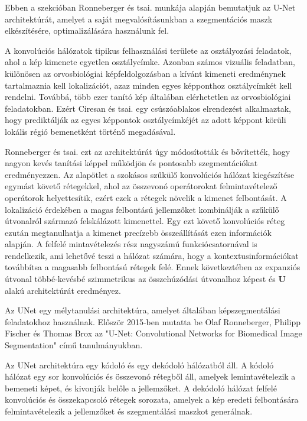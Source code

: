\documentclass[12pt,a4]{article}
\begin{document}
                Ebben a szekcióban \cite{unet}Ronneberger és tsai. munkája alapján bemutatjuk az U-Net architektúrát, amelyet a saját megvalósításunkban a szegmentációs maszk elkészítésére, optimalizálására használunk fel. 
    
                A konvolúciós hálózatok tipikus felhasználási területe az osztályozási feladatok, ahol a kép kimenete egyetlen osztálycímke. Azonban számos vizuális feladatban, különösen az orvosbiológiai képfeldolgozásban a kívánt kimeneti eredménynek tartalmaznia kell lokalizációt, azaz minden egyes képponthoz osztálycímkét kell rendelni. Továbbá, több ezer tanító kép általában elérhetetlen az orvosbiológiai feladatokban. Ezért \cite{ciresan}Ciresan és tsai. egy csúszóablakos elrendezést alkalmaztak, hogy prediktálják
                az egyes képpontok osztálycímkéjét az adott képpont körüli lokális régió bemenetként történő megadásával.
    
                \cite{unet}Ronneberger és tsai. ezt az architektúrát úgy módosították és bővítették, hogy
                nagyon kevés tanítási képpel működjön és pontosabb szegmentációkat eredményezzen.
                Az alapötlet a szokásos szűkülő konvolúciós hálózat kiegészítése egymást követő rétegekkel, ahol az összevonó operátorokat felmintavételező operátorok helyettesítik, ezért ezek a rétegek növelik a kimenet felbontását. A lokalizáció érdekében a magas felbontású jellemzőket kombinálják a szűkülő útvonalról származó felskálázott kimenettel. Egy ezt követő konvolúciós réteg ezután megtanulhatja a kimenet precízebb összeállítását ezen információk alapján. A felfelé mintavételezés rész nagyszámú funkciócsatornával is rendelkezik, ami lehetővé teszi a hálózat számára, hogy a kontextusinformációkat továbbítsa a magasabb felbontású rétegek felé. Ennek következtében az expanziós útvonal többé-kevésbé szimmetrikus az összehúzódási útvonalhoz képest és \textbf{U} alakú architektúrát eredményez.
    
                Az UNet egy mélytanulási architektúra, amelyet általában képszegmentálási feladatokhoz használnak. Először 2015-ben mutatta be \cite{unet}Olaf Ronneberger, Philipp Fischer és Thomas Brox az "U-Net: Convolutional Networks for Biomedical Image Segmentation" című tanulmányukban.
    
                Az UNet architektúra egy kódoló és egy dekódoló hálózatból áll. A kódoló hálózat egy sor konvolúciós és összevonó rétegből áll, amelyek lemintavételezik a bemeneti képet, és kivonják belőle a jellemzőket. A dekódoló hálózat felfelé konvolúciós és összekapcsoló rétegek sorozata, amelyek a kép eredeti felbontására felmintavételezik a jellemzőket és szegmentálási maszkot generálnak.
    
\end{document}
